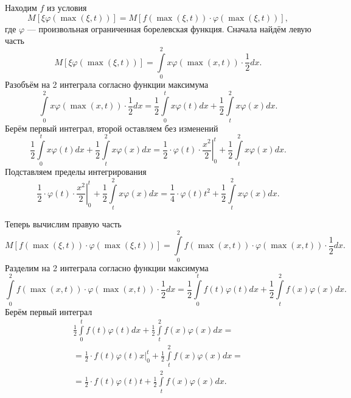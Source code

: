 \begin{enumerate}[label=\alph*)]
  Находим $f$ из условия
  $$M \left[ \xi \varphi \left( \max \left( \xi, t \right) \right) \right] =
    M \left[
      f \left( \max \left( \xi, t \right) \right) \cdot
      \varphi \left( \max \left( \xi, t \right) \right)
    \right],$$
  где $ \varphi $ --- произвольная ограниченная борелевская функция.
  Сначала найдём левую часть
  $$M \left[ \xi \varphi \left( \max \left( \xi, t \right) \right) \right] =
    \int \limits_0^2 x \varphi \left( \max \left( x, t \right) \right) \cdot \frac{1}{2} dx.$$
  Разобъём на 2 интеграла согласно функции максимума
  $$ \int \limits_0^2 x \varphi \left( \max \left( x, t \right) \right) \cdot \frac{1}{2} dx =
    \frac{1}{2} \int \limits_0^t x \varphi \left( t \right) dx +
    \frac{1}{2} \int \limits_t^2 x \varphi \left( x \right) dx.$$
  Берём первый интеграл, второй оставляем без изменений
  $$ \frac{1}{2} \int \limits_0^t x \varphi \left( t \right) dx +
    \frac{1}{2} \int \limits_t^2 x \varphi \left( x \right) dx =
    \frac{1}{2} \cdot \left. \varphi \left( t \right) \cdot \frac{x^2}{2} \right|_0^t +
    \frac{1}{2} \int \limits_t^2 x \varphi \left( x \right) dx.$$
  Подставляем пределы интегрирования
  $$ \frac{1}{2} \cdot \left. \varphi \left( t \right) \cdot \frac{x^2}{2} \right|_0^t +
    \frac{1}{2} \int \limits_t^2 x \varphi \left( x \right) dx =
    \frac{1}{4} \cdot \varphi \left( t \right) t^2 +
    \frac{1}{2} \int \limits_t^2 x \varphi \left( x \right) dx.$$

  Теперь вычислим правую часть
  $$M \left[
      f \left( \max \left( \xi, t \right) \right) \cdot
      \varphi \left( \max \left( \xi, t \right) \right)
    \right] =
    \int \limits_0^2
      f \left( \max \left( x, t \right) \right) \cdot
      \varphi \left( \max \left( x, t \right) \right) \cdot \frac{1}{2}
    dx.$$
  Разделим на 2 интеграла согласно функции максимума
  $$ \int \limits_0^2
      f \left( \max \left( x, t \right) \right) \cdot
      \varphi \left( \max \left( x, t \right) \right) \cdot \frac{1}{2}
    dx =
    \frac{1}{2} \int \limits_0^t f \left( t \right) \varphi \left( t \right) dx +
    \frac{1}{2} \int \limits_t^2 f \left( x \right) \varphi \left( x \right) dx.$$
  Берём первый интеграл
  \begin{equation*}
    \begin{split}
      \frac{1}{2} \int \limits_0^t f \left( t \right) \varphi \left( t \right) dx +
      \frac{1}{2} \int \limits_t^2 f \left( x \right) \varphi \left( x \right) dx = \\
      = \frac{1}{2} \cdot \left. f \left( t \right) \varphi \left( t \right) x \right|_0^t +
      \frac{1}{2} \int \limits_t^2 f \left( x \right) \varphi \left( x \right) dx = \\
      = \frac{1}{2} \cdot f \left( t \right) \varphi \left( t \right) t +
      \frac{1}{2} \int \limits_t^2 f \left( x \right) \varphi \left( x \right) dx.
    \end{split}
  \end{equation*}


\end{enumerate}
